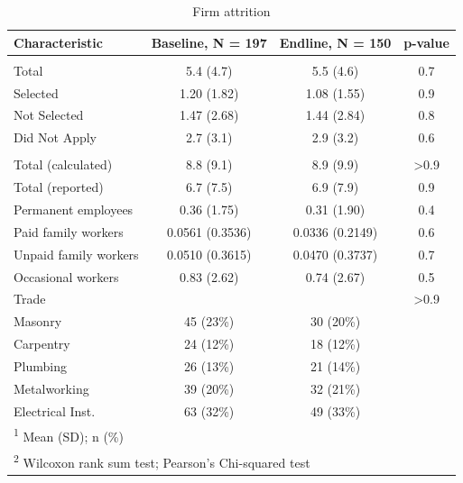 \documentclass[
  11pt,
a4paper
]{report}
\begin{document}
\singlespacing
\begin{table}[H]

\caption{\label{tab:tbl-attritionfirms}Firm attrition}
\centering
\begin{tabular}[t]{lccc}
\toprule
\textbf{Characteristic} & \textbf{Baseline}, N = 197 & \textbf{Endline}, N = 150 & \textbf{p-value}\\
\midrule
\addlinespace[0.3em]
\multicolumn{4}{l}{Apprentices trained}\\
\hspace{1em}Total & 5.4 (4.7) & 5.5 (4.6) & 0.7\\
\hspace{1em}Selected & 1.20 (1.82) & 1.08 (1.55) & 0.9\\
\hspace{1em}Not Selected & 1.47 (2.68) & 1.44 (2.84) & 0.8\\
\hspace{1em}Did Not Apply & 2.7 (3.1) & 2.9 (3.2) & 0.6\\
\addlinespace[0.3em]
\multicolumn{4}{l}{Firm size}\\
\hspace{1em}Total (calculated) & 8.8 (9.1) & 8.9 (9.9) & >0.9\\
\hspace{1em}Total (reported) & 6.7 (7.5) & 6.9 (7.9) & 0.9\\
\hspace{1em}Permanent employees & 0.36 (1.75) & 0.31 (1.90) & 0.4\\
\hspace{1em}Paid family workers & 0.0561 (0.3536) & 0.0336 (0.2149) & 0.6\\
\hspace{1em}Unpaid family workers & 0.0510 (0.3615) & 0.0470 (0.3737) & 0.7\\
\hspace{1em}Occasional workers & 0.83 (2.62) & 0.74 (2.67) & 0.5\\
Trade &  &  & >0.9\\
\hspace{1em}Masonry & 45 (23\%) & 30 (20\%) & \\
\hspace{1em}Carpentry & 24 (12\%) & 18 (12\%) & \\
\hspace{1em}Plumbing & 26 (13\%) & 21 (14\%) & \\
\hspace{1em}Metalworking & 39 (20\%) & 32 (21\%) & \\
\hspace{1em}Electrical Inst. & 63 (32\%) & 49 (33\%) & \\
\bottomrule
\multicolumn{4}{l}{\rule{0pt}{1em}\textsuperscript{1} Mean (SD); n (\%)}\\
\multicolumn{4}{l}{\rule{0pt}{1em}\textsuperscript{2} Wilcoxon rank sum test; Pearson's Chi-squared test}\\
\end{tabular}
\end{table}
\doublespacing
\end{document}
